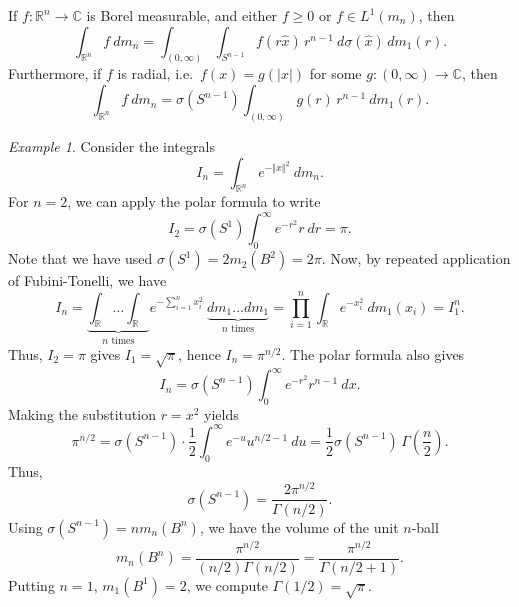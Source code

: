\documentclass[11pt]{article}
\newcommand{\C}{\mathbb{C}}
\newcommand{\R}{\mathbb{R}}
\newcommand{\norm}[1]{\Vert #1 \Vert}
\theoremstyle{definition}
\theoremstyle{remark}
\newtheorem*{example}{Example}
\numberwithin{equation}{section}
\begin{document}
    \begin{lemma}
        If $f\colon \R^n \to \C$ is Borel measurable, and either $f \geq 0$ or $f\in
        L^1(m_n)$, then \[
            \int_{\R^n} f\:dm_n = \int_{(0, \infty)} \int_{S^{n - 1}} f(r\hat{x})
            \,r^{n - 1}\:d\sigma(\hat{x})\,dm_1(r).
        \] Furthermore, if $f$ is radial, i.e.\ $f(x) = g(|x|)$ for some $g\colon (0,
        \infty) \to \C$, then \[
            \int_{\R^n} f\:dm_n = \sigma(S^{n - 1}) \int_{(0, \infty)} g(r)\,r^{n -
            1}\:dm_1(r).
        \] 
    \end{lemma}

    \begin{example}
        Consider the integrals \[
            I_n = \int_{\R^n} e^{-\norm{x}^2}\:dm_n.
        \] For $n = 2$, we can apply the polar formula to write \[
            I_2 = \sigma(S^1)\int_0^\infty e^{-r^2} r\:dr = \pi.
        \] Note that we have used $\sigma(S^1) = 2m_2(B^2) = 2\pi$. Now, by repeated
        application of Fubini-Tonelli, we have \[
            I_n = \underbrace{\int_\R \dots \int_\R}_{n\text{ times}}
            e^{-\sum_{i = 1}^n x_i^2}\:\underbrace{dm_1 \dots dm_1}_{n\text{ times}}
            = \prod_{i = 1}^n \int_\R e^{-x_i^2} \:dm_1(x_i) = I_1^n.
        \] Thus, $I_2 = \pi$ gives $I_1 = \sqrt{\pi}$, hence $I_n = \pi^{n / 2}$. The
        polar formula also gives \[
            I_n = \sigma(S^{n - 1})\int_0^\infty e^{-r^2} r^{n - 1}\:dx.
        \] Making the substitution $r = x^2$ yields \[
            \pi^{n / 2} = \sigma(S^{n - 1}) \cdot \frac{1}{2} \int_0^\infty e^{-u}
            u^{n /2 - 1}\:du = \frac{1}{2} \sigma(S^{n - 1})
            \,\Gamma\left(\frac{n}{2}\right).
        \] Thus, \[
            \sigma(S^{n - 1}) = \frac{2\pi^{n / 2}}{\Gamma(n / 2)}.
        \] Using $\sigma(S^{n - 1}) = nm_n(B^n)$, we have the volume of the unit
        $n$-ball \[
            m_n(B^n) = \frac{\pi^{n / 2}}{(n / 2)\Gamma(n / 2)} = \frac{\pi^{n /
            2}}{\Gamma(n / 2 + 1)}.
        \] Putting $n = 1$, $m_1(B^1) = 2$, we compute $\Gamma(1 / 2) = \sqrt{\pi}$.
    \end{example}
\end{document}
